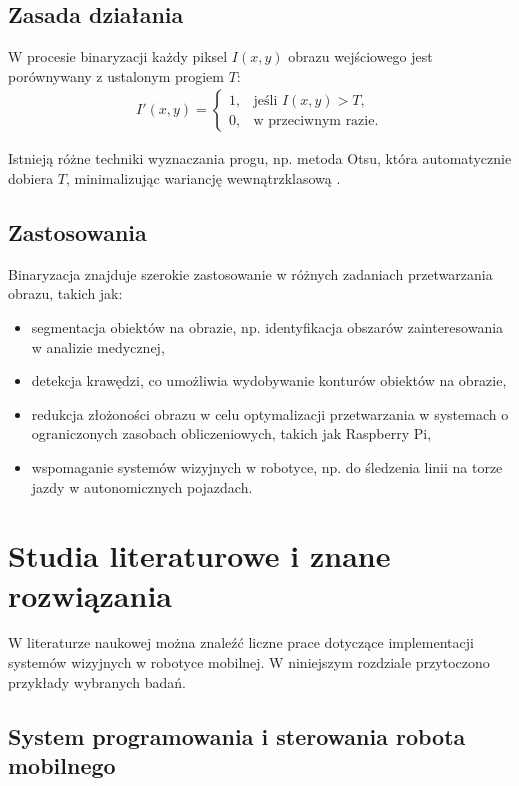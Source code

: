 \documentclass[a4paper,twoside,12pt]{book}
\begin{document}
\subsection{Zasada działania}
W procesie binaryzacji każdy piksel \( I(x, y) \) obrazu wejściowego jest porównywany z ustalonym progiem \( T \):
\begin{align}
    I'(x, y) =
    \begin{cases} 
        1, & \text{jeśli } I(x, y) > T, \\
        0, & \text{w przeciwnym razie}.
    \end{cases}
\end{align}

Istnieją różne techniki wyznaczania progu, np. metoda Otsu, która automatycznie dobiera \( T \), minimalizując wariancję wewnątrzklasową \cite{bib:huang2012improved}.

\subsection{Zastosowania}
Binaryzacja znajduje szerokie zastosowanie w różnych zadaniach przetwarzania obrazu, takich jak:
\begin{itemize}
    \item segmentacja obiektów na obrazie, np. identyfikacja obszarów zainteresowania w analizie medycznej,
    \item detekcja krawędzi, co umożliwia wydobywanie konturów obiektów na obrazie,
    \item redukcja złożoności obrazu w celu optymalizacji przetwarzania w systemach o ograniczonych zasobach obliczeniowych, takich jak Raspberry Pi,
    \item wspomaganie systemów wizyjnych w robotyce, np. do śledzenia linii na torze jazdy w autonomicznych pojazdach.
\end{itemize}

\section{Studia literaturowe i znane rozwiązania}
W literaturze naukowej można znaleźć liczne prace dotyczące implementacji systemów wizyjnych w robotyce mobilnej. W niniejszym rozdziale przytoczono przykłady wybranych badań.

\subsection{System programowania i sterowania robota mobilnego}
\end{document}
